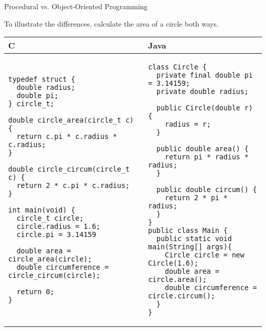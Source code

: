 \documentclass{beamer}
\begin{document}
\begin{frame}[fragile]{Procedural vs. Object-Oriented Programming}

To illustrate the differences, calculate the area of a circle both ways.

\centering
\begin{tabular}{@{}m{} | m{}@{}}
C					&					Java	\\
\hline
\begin{Verbatim}[fontsize=\tiny]
typedef struct {
  double radius;
  double pi;
} circle_t;

double circle_area(circle_t c) {
  return c.pi * c.radius * c.radius;
}

double circle_circum(circle_t c) {
  return 2 * c.pi * c.radius;
}

int main(void) {
  circle_t circle;
  circle.radius = 1.6;
  circle.pi = 3.14159
  
  double area = circle_area(circle);
  double circumference = circle_circum(circle);
	
  return 0;
}
\end{Verbatim}	

&

\begin{Verbatim}[fontsize=\tiny]
class Circle {
  private final double pi = 3.14159;
  private double radius;
  
  public Circle(double r) {
    radius = r;
  }
  
  public double area() {
    return pi * radius * radius;
  }
  
  public double circum() {
    return 2 * pi * radius;
  }
}
public class Main {
  public static void main(String[] args){
    Circle circle = new Circle(1.6);
    double area = circle.area();
    double circumference = circle.circum();
  }
}
\end{Verbatim}	

\end{tabular}

\end{frame}
\end{document}
